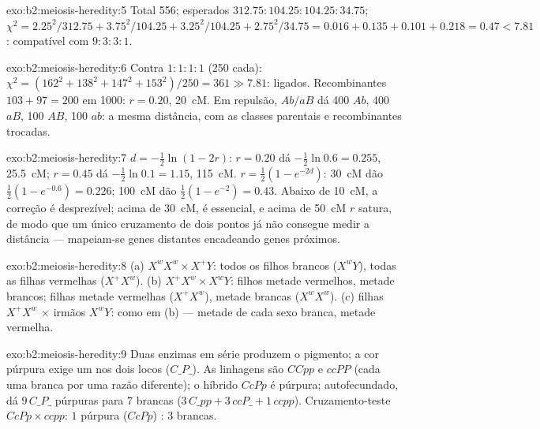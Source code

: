 \begin{solution}{exo:b2:meiosis-heredity:5}
Total 556; esperados $312.75 : 104.25 : 104.25 : 34.75$; $\chi^2 =
2.25^2/312.75 + 3.75^2/104.25 + 3.25^2/104.25 + 2.75^2/34.75 = 0.016
+ 0.135 + 0.101 + 0.218 = 0.47 < 7.81$: compatível com $9 : 3 : 3 :
1$.
\end{solution}

\begin{solution}{exo:b2:meiosis-heredity:6}
Contra $1 : 1 : 1 : 1$ (250 cada): $\chi^2 = (162^2 + 138^2 + 147^2
+ 153^2)/250 = 361 \gg 7.81$: ligados. Recombinantes $103 + 97 = 200$
em 1000: $r = 0.20$, \qty{20}{cM}. Em repulsão, $Ab/aB$ dá 400
$Ab$, 400 $aB$, 100 $AB$, 100 $ab$: a mesma distância, com as classes
parentais e recombinantes trocadas.
\end{solution}

\begin{solution}{exo:b2:meiosis-heredity:7}
$d = -\tfrac12\ln(1 - 2r)$: $r = 0.20$ dá $-\tfrac12\ln 0.6 =
0.255$, \qty{25.5}{cM}; $r = 0.45$ dá $-\tfrac12\ln 0.1 = 1.15$,
\qty{115}{cM}. $r = \tfrac12(1 - e^{-2d})$: \qty{30}{cM} dão
$\tfrac12(1 - e^{-0.6}) = 0.226$; \qty{100}{cM} dão $\tfrac12(1 -
e^{-2}) = 0.43$. Abaixo de \qty{10}{cM}, a correção é desprezível;
acima de \qty{30}{cM}, é essencial, e acima de \qty{50}{cM} $r$ satura,
de modo que um único cruzamento de dois pontos já não consegue medir a
distância --- mapeiam-se genes distantes encadeando genes próximos.
\end{solution}

\begin{solution}{exo:b2:meiosis-heredity:8}
(a) $X^wX^w \times X^+Y$: todos os filhos brancos ($X^wY$), todas as
filhas vermelhas ($X^+X^w$). (b) $X^+X^w \times X^wY$: filhos metade
vermelhos, metade brancos; filhas metade vermelhas ($X^+X^w$), metade
brancas ($X^wX^w$). (c) filhas
$X^+X^w$ $\times$ irmãos $X^wY$: como em (b) --- metade de cada sexo
branca, metade vermelha.
\end{solution}

\begin{solution}{exo:b2:meiosis-heredity:9}
Duas enzimas em série produzem o pigmento; a cor púrpura exige um
  nos dois locos ($C\_P\_$). As linhagens são $CCpp$ e
$ccPP$ (cada uma branca por uma razão diferente); o híbrido $CcPp$ é
púrpura; autofecundado, dá $9\,C\_P\_$ púrpuras para $7$ brancas
($3\,C\_pp + 3\,ccP\_ +
1\,ccpp$). Cruzamento-teste $CcPp\times ccpp$: $1$ púrpura ($CcPp$) :
$3$ brancas.
\end{solution}

